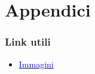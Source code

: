 \documentclass{book}
\begin{document}

%

\part{Appendici}



\section*{Link utili}
\begin{itemize}
    \item \href{https://drive.google.com/drive/folders/1nu4RMBqniPuS5pC0v9kfnmJ1coKzccGm?usp=sharing}{\textcolor{blue}{Immagini}}
\end{itemize}
\end{document}
